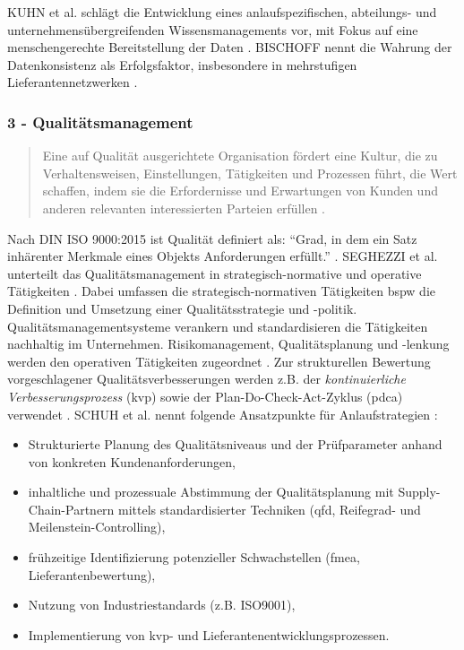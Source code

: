 KUHN et al. schlägt die Entwicklung eines anlaufspezifischen, abteilungs- und unternehmensübergreifenden Wissensmanagements vor, mit Fokus auf eine menschengerechte Bereitstellung der Daten \autocite{Kuhn2002}. 
BISCHOFF  nennt die Wahrung der Datenkonsistenz als Erfolgsfaktor, insbesondere in mehrstufigen Lieferantennetzwerken \autocite{Bischoff2007}. 

\subsubsection*{3 - Qualitätsmanagement}
\begin{quotation}
 Eine auf Qualität ausgerichtete Organisation fördert eine Kultur, die zu Verhaltensweisen, Einstellungen, Tätigkeiten und Prozessen führt, die Wert schaffen, indem sie die Erfordernisse und Erwartungen von Kunden und anderen relevanten interessierten Parteien erfüllen \autocite[10]{ISO9000}. %
\end{quotation}

Nach DIN ISO 9000:2015 ist Qualität definiert als: ``Grad, in dem ein Satz inhärenter Merkmale eines Objekts Anforderungen erfüllt.'' \autocite[39]{ISO9000}. %
SEGHEZZI et al. unterteilt das Qualitätsmanagement in strategisch-normative und operative Tätigkeiten \autocite{Seghezzi2013}. 
Dabei umfassen die strategisch-normativen Tätigkeiten \gls{bspw} die Definition und Umsetzung einer Qualitätsstrategie und -politik. Qualitätsmanagementsysteme verankern und standardisieren die Tätigkeiten nachhaltig im Unternehmen. 
Risikomanagement, Qualitätsplanung und -lenkung werden den operativen Tätigkeiten zugeordnet \autocite{Seghezzi2013}. 
Zur strukturellen Bewertung vorgeschlagener Qualitätsverbesserungen werden z.B. der \textit{kontinuierliche Verbesserungsprozess} (\gls{kvp}) sowie der Plan-Do-Check-Act-Zyklus (\gls{pdca}) verwendet \autocite[17]{Schuh2008}.
% 
SCHUH et al. nennt folgende Ansatzpunkte für Anlaufstrategien \autocite[17]{Schuh2008}: 
\begin{itemize}
 \item Strukturierte Planung des Qualitätsniveaus und der Prüfparameter anhand von konkreten Kundenanforderungen,
 \item inhaltliche und prozessuale Abstimmung der Qualitätsplanung mit Supply-Chain-Partnern mittels standardisierter Techniken (\gls{qfd}, Reifegrad- und Meilenstein-Controlling),
 \item frühzeitige Identifizierung potenzieller Schwachstellen (\gls{fmea}, Lieferantenbewertung),
 \item Nutzung von Industriestandards (z.B. ISO9001),
 \item Implementierung von \gls{kvp}- und Lieferantenentwicklungsprozessen.
\end{itemize}

